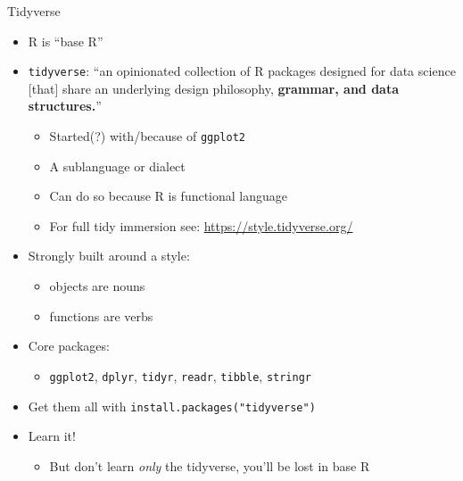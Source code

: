 \documentclass[
  ignorenonframetext,
]{beamer}
\providecommand{\tightlist}{%
  \setlength{\itemsep}{0pt}\setlength{\parskip}{0pt}}
\begin{document}
\begin{frame}[fragile]{Tidyverse}
\protect\hypertarget{tidyverse}{}

\begin{itemize}
\tightlist
\item
  R is ``base R''
\item
  \texttt{tidyverse}: ``an opinionated collection of R packages designed
  for data science {[}that{]} share an underlying design philosophy,
  \textbf{grammar, and data structures.}''

  \begin{itemize}
  \tightlist
  \item
    Started(?) with/because of \texttt{ggplot2}
  \item
    A sublanguage or dialect
  \item
    Can do so because R is functional language
  \item
    For full tidy immersion see: \url{https://style.tidyverse.org/}
  \end{itemize}
\item
  Strongly built around a style:

  \begin{itemize}
  \tightlist
  \item
    objects are nouns
  \item
    functions are verbs
  \end{itemize}
\item
  Core packages:

  \begin{itemize}
  \tightlist
  \item
    \texttt{ggplot2}, \texttt{dplyr}, \texttt{tidyr}, \texttt{readr},
    \texttt{tibble}, \texttt{stringr}
  \end{itemize}
\item
  Get them all with \texttt{install.packages("tidyverse")}
\item
  Learn it!

  \begin{itemize}
  \tightlist
  \item
    But don't learn \emph{only} the tidyverse, you'll be lost in base R
  \end{itemize}
\end{itemize}

\end{frame}
\end{document}
